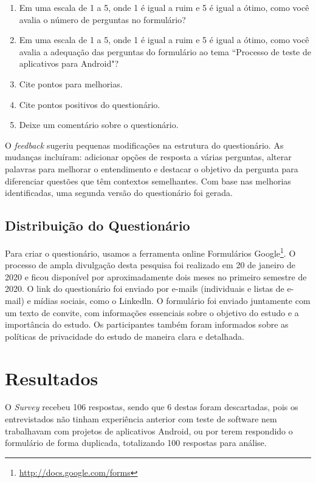 \begin{enumerate}
    \item Em uma escala de 1 a 5, onde 1 é igual a ruim e 5 é igual a ótimo, como você avalia o número de perguntas no formulário?
    \item Em uma escala de 1 a 5, onde 1 é igual a ruim e 5 é igual a ótimo, como você avalia a adequação das perguntas do formulário ao tema ``Processo de teste de aplicativos para Android"?
    \item Cite pontos para melhorias.
    \item Cite pontos positivos do questionário.
    \item Deixe um comentário sobre o questionário.
\end{enumerate}

O \textit{feedback} sugeriu pequenas modificações na estrutura do questionário. As mudanças incluíram: adicionar opções de resposta a várias perguntas, alterar palavras para melhorar o entendimento e destacar o objetivo da pergunta para diferenciar questões que têm contextos semelhantes. Com base nas melhorias identificadas, uma segunda versão do questionário foi gerada.


\subsection{Distribuição do Questionário}

Para criar o questionário, usamos a ferramenta online Formulários Google\footnote{\url{http://docs.google.com/forms}}. O processo de ampla divulgação desta pesquisa foi realizado em 20 de janeiro de 2020 e ficou disponível por aproximadamente dois meses no primeiro semestre de 2020. O link do questionário foi enviado por e-mails (individuais e listas de e-mail) e mídias sociais, como o Linkedln. %
O formulário foi enviado juntamente com um texto de convite, com informações essenciais sobre o objetivo do estudo e a importância do estudo. Os participantes também foram informados sobre as políticas de privacidade do estudo de maneira clara e detalhada.


\section{Resultados}\label{resultssurvey}

O \textit{Survey} recebeu 106 respostas, sendo que 6 destas foram descartadas, pois os entrevistados não tinham experiência anterior com teste de software nem trabalhavam com projetos de aplicativos Android, ou por terem respondido o formulário de forma duplicada, totalizando 100 respostas para análise. 

